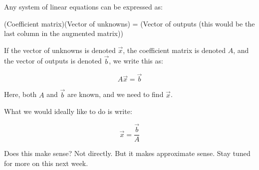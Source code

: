\documentclass[10pt]{amsart}
\begin{document}
Any system of linear equations can be expressed as:

(Coefficient matrix)(Vector of unknowns) = (Vector of outputs (this would be the last column in the augmented matrix))

If the vector of unknowns is denoted $\vec{x}$, the coefficient matrix
is denoted $A$, and the vector of outputs is denoted $\vec{b}$, we write this as:

$$A \vec{x} = \vec{b}$$

Here, both $A$ and $\vec{b}$ are known, and we need to find $\vec{x}$.

What we would ideally like to do is write:

$$\vec{x} = \frac{\vec{b}}{A}$$

Does this make sense? Not directly. But it makes approximate
sense. Stay tuned for more on this next week.
\end{document}
